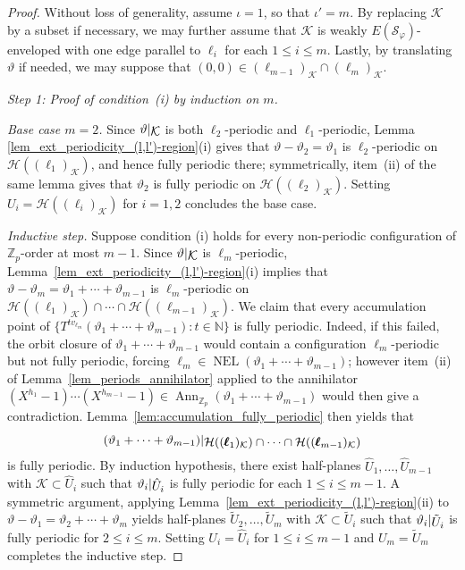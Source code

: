 \documentclass[12pt]{amsart}
\numberwithin{equation}{section}
\DeclareMathOperator{\Ann}{Ann}
\DeclareMathOperator{\nexpl}{NEL}
\newcommand{\bb}[1]{\mathbb{#1}}
\newcommand{\sob}[1]{\ensuremath{{\mathbin |}\raise-.4ex\hbox{$#1$}}}
\begin{document}
\begin{proof}
Without loss of generality, assume $\iota = 1$, so that $\iota' = m$. By replacing $\mathcal{K}$ by a subset if necessary, we may further assume that $\mathcal{K}$ is weakly $E(\mathcal{S}_{\varphi})$-enveloped with one edge parallel to $\pmb{\ell}_i$ for each $1 \leq i \leq m$. Lastly, by translating $\vartheta$ if needed, we may suppose that $(0,0) \in (\pmb{\ell}_{m-1})_{\mathcal{K}} \cap (\pmb{\ell}_{m})_{\mathcal{K}}$.

\medskip

\noindent\textit{Step 1: Proof of condition~\textup{(i)} by induction on $m$.}

\smallskip

\textit{Base case $m=2$.} Since $\vartheta\sob{\mathcal{K}}$ is both $\ell_2$-periodic and $\ell_1$-periodic, Lemma \ref{lem_ext_periodicity_(l,l')-region}(i) gives that $\vartheta-\vartheta_2 = \vartheta_1$ is $\ell_2$-periodic on $\mathcal{H}((\pmb{\ell}_1)_{\mathcal{K}})$, and hence fully periodic there; symmetrically, item~(ii) of the same lemma gives that $ \vartheta_2$ is fully periodic on $\mathcal{H}((\pmb{\ell}_2)_{\mathcal{K}})$. Setting $U_i = \mathcal{H}((\pmb{\ell}_i)_{\mathcal{K}})$ for $i = 1,2$ concludes the base case. 

\textit{Inductive step.} Suppose condition (i) holds for every non-periodic configuration of \(\bb{Z}_p\)-order at most $m-1$. Since $\vartheta\sob{\mathcal{K}}$ is $\ell_m$-periodic, Lem\-ma~\ref{lem_ext_periodicity_(l,l')-region}(i) implies that $\vartheta-\vartheta_m = \vartheta_1+\cdots+\vartheta_{m-1}$ is $\ell_m$-periodic on $\mathcal{H}((\pmb{\ell}_1)_{\mathcal{K}}) \cap \cdots \cap  \mathcal{H}((\pmb{\ell}_{m-1})_{\mathcal{K}})$. We claim that every accumulation point of $\{T^{t v_{\pmb{\ell}_m}}(\vartheta_1+\cdots+\vartheta_{m-1}) : t \in \bb{N}\}$ is fully periodic. Indeed, if this failed, the orbit closure of $ \vartheta_1+\cdots+\vartheta_{m-1} $ would contain a configuration $\ell_m$-periodic but not fully periodic, forcing $\ell_m \in \nexpl(\vartheta_1+\cdots+\vartheta_{m-1})$; however item~(ii) of Lemma~\ref{lem_periods_annihilator} applied to the annihilator $(X^{h_1}-1) \cdots (X^{h_{m-1}}-1) \in \Ann_{\bb{Z}_p}(\vartheta_1+\cdots+\vartheta_{m-1})$ would then give a con\-tra\-dic\-tion. Lem\-ma~\ref{lem:accumulation_fully_periodic} then yields that 
$$(\vartheta_1+\cdots+\vartheta_{m-1})\sob{\mathcal{H}((\pmb{\ell}_1)_{\mathcal{K}}) \cap \cdots \cap \mathcal{H}((\pmb{\ell}_{m-1})_{\mathcal{K}})}$$ 
is fully periodic. By induction hypothesis, there exist half-planes $\hat{U}_1, \ldots, \hat{U}_{m-1} $ with $\mathcal{K} \subset \hat{U}_i$ such that $\vartheta_i\sob{\hat{U}_i}$ is fully periodic for each $1 \leq i \leq m-1$. A symmetric argument, applying 
Lem\-ma~\ref{lem_ext_periodicity_(l,l')-region}(ii) to $\vartheta-\vartheta_1 = \vartheta_2+\cdots+\vartheta_m$ yields half-planes $\tilde{U}_2, \ldots, \tilde{U}_m $ with $\mathcal{K} \subset \tilde{U}_i$ such that $\vartheta_i\sob{\tilde{U}_i}$ is fully periodic for $2 \leq i \leq m$. Setting $U_i = \hat{U}_i$ for $1 \leq i \leq m-1$ and $U_m = \tilde{U}_m$ completes the inductive step.


\end{proof}
\end{document}
